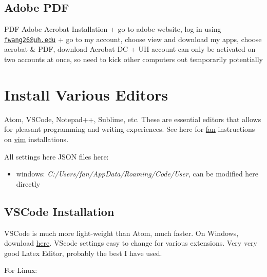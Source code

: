 \documentclass[]{article}
\providecommand{\tightlist}{%
  \setlength{\itemsep}{0pt}\setlength{\parskip}{0pt}}
\begin{document}
\hypertarget{adobe-pdf}{%
\subsection{Adobe PDF}\label{adobe-pdf}}

PDF Adobe Acrobat Installation + go to adobe website, log in using
\href{mailto:fwang26@uh.edu}{\nolinkurl{fwang26@uh.edu}} + go to my
account, choose view and download my apps, choose acrobat \& PDF,
download Acrobat DC + UH account can only be activated on two accounts
at once, so need to kick other computers out temporarily potentially

\hypertarget{install-various-editors}{%
\section{Install Various Editors}\label{install-various-editors}}

Atom, VSCode, Notepad++, Sublime, etc. These are essential editors that
allows for pleasant programming and writing experiences. See here for
\href{http://fanwangecon.github.io/}{fan} instructions on
\href{https://fanwangecon.github.io/Tex4Econ/nontex/install/linux/fn_vim.html}{vim}
installations.

All settings here JSON files here:

\begin{itemize}
\tightlist
\item
  windows: \emph{C:/Users/fan/AppData/Roaming/Code/User}, can be
  modified here directly
\end{itemize}

\hypertarget{vscode-installation}{%
\subsection{VSCode Installation}\label{vscode-installation}}

VSCode is much more light-weight than Atom, much faster. On Windows,
download \href{https://code.visualstudio.com/download}{here}. VScode
settings easy to change for various extensions. Very very good Latex
Editor, probably the best I have used.

For Linux:
\end{document}
